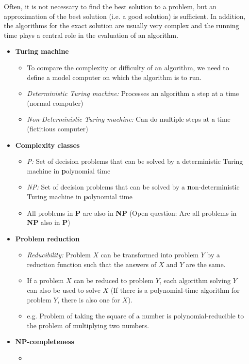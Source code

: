 
Often, it is not necessary to find the best solution to a problem, but an approximation of the best solution (i.e. a good solution) is sufficient. In addition, the algorithms for the exact solution are usually very complex and the running time plays a central role in the evaluation of an algorithm.

\begin{itemize}
    \item \textbf{Turing machine}
    \begin{itemize}
        \item To compare the complexity or difficulty of an algorithm, we need to define a model computer on which the algorithm is to run.
        \item \emph{Deterministic Turing machine:} Processes an algorithm a step at a time (normal computer)
        \item \emph{Non-Deterministic Turing machine:} Can do multiple steps at a time (fictitious computer)
    \end{itemize}
    \item \textbf{Complexity classes}
    \begin{itemize}
        \item \emph{P:} Set of decision problems that can be solved by a deterministic Turing machine in \textbf{p}olynomial time
        \item \emph{NP:} Set of decision problems that can be solved by a \textbf{n}on-deterministic Turing machine in \textbf{p}olynomial time
        \item All problems in \textbf{P} are also in \textbf{NP} (Open question: Are all problems in \textbf{NP} also in \textbf{P})
    \end{itemize}
    \item \textbf{Problem reduction}
    \begin{itemize}
        \item \emph{Reducibility:} Problem $X$ can be transformed into problem $Y$ by a reduction function such that the answers of $X$ and $Y$ are the same.
        \item If a problem $X$ can be reduced to problem $Y$, each algorithm solving $Y$ can also be used to solve $X$ (If there is a polynomial-time algorithm for problem $Y$, there is also one for $X$).
        \item e.g. Problem of taking the square of a number is polynomial-reducible to the problem of multiplying two numbers.
    \end{itemize}
    \item \textbf{NP-completeness}
    \begin{itemize}
        \item 
    \end{itemize}
\end{itemize}

